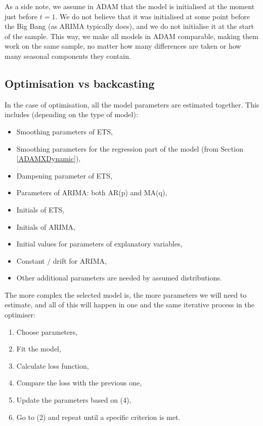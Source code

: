 \documentclass[
]{book}
\providecommand{\tightlist}{%
  \setlength{\itemsep}{0pt}\setlength{\parskip}{0pt}}
\theoremstyle{definition}
\theoremstyle{definition}
\theoremstyle{definition}
\theoremstyle{definition}
\theoremstyle{remark}
\begin{document}
As a side note, we assume in ADAM that the model is initialised at the moment just before \(t=1\). We do not believe that it was initialised at some point before the Big Bang (as ARIMA typically does), and we do not initialise it at the start of the sample. This way, we make all models in ADAM comparable, making them work on the same sample, no matter how many differences are taken or how many seasonal components they contain.

\hypertarget{ADAMInitialisationOptAndBack}{%
\subsection{Optimisation vs backcasting}\label{ADAMInitialisationOptAndBack}}

In the case of optimisation, all the model parameters are estimated together. This includes (depending on the type of model):

\begin{itemize}
\tightlist
\item
  Smoothing parameters of ETS,
\item
  Smoothing parameters for the regression part of the model (from Section \ref{ADAMXDynamic}),
\item
  Dampening parameter of ETS,
\item
  Parameters of ARIMA: both AR(p) and MA(q),
\item
  Initials of ETS,
\item
  Initials of ARIMA,
\item
  Initial values for parameters of explanatory variables,
\item
  Constant / drift for ARIMA,
\item
  Other additional parameters are needed by assumed distributions.
\end{itemize}

The more complex the selected model is, the more parameters we will need to estimate, and all of this will happen in one and the same iterative process in the optimiser:

\begin{enumerate}
\def\labelenumi{\arabic{enumi}.}
\tightlist
\item
  Choose parameters,
\item
  Fit the model,
\item
  Calculate loss function,
\item
  Compare the loss with the previous one,
\item
  Update the parameters based on (4),
\item
  Go to (2) and repeat until a specific criterion is met.
\end{enumerate}
\end{document}

